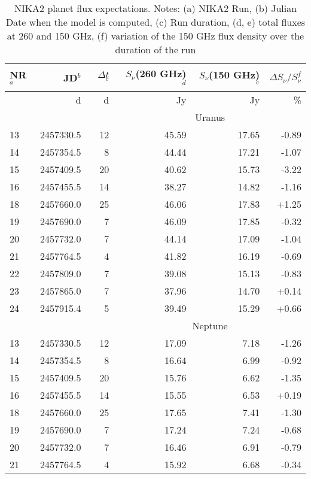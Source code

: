 \begin{table*}[!h]
  \caption[NIKA2 planet flux expectations]{NIKA2 planet flux
    expectations. Notes: (a) NIKA2 Run, (b) Julian Date when the model
    is computed, (c) Run duration, (d, e) total fluxes at 260 and 150
    GHz, (f) variation of the 150 GHz flux density over the duration of the run}
\centering
\begin{tabular}{|l|r|r|r|r|r|}
\hline
NR$^{a}$  & JD$^{b}$ & $\Delta t$ $^{c}$ & $S_{\nu}$(260 GHz)  $^{d}$& $S_{\nu}$(150  GHz)$^{e}$  & $\Delta S_{\nu}/  S_{\nu} ^{f}$  \\
\hline
         & d  &  d        & Jy               & Jy                 &                                                                    \%  \\
\hline
         &    &            & \multicolumn{3}{|c|}{Uranus}\\
\hline
13 & 2457330.5 &  12 & 45.59 & 17.65 & -0.89\\
14 & 2457354.5 &  8 & 44.44 & 17.21 & -1.07\\
15 & 2457409.5 &  20 & 40.62 & 15.73 & -3.22\\
16 & 2457455.5 &  14 & 38.27 & 14.82 & -1.16\\
18 & 2457660.0 &  25 & 46.06 & 17.83 & +1.25\\
19 & 2457690.0 &  7 & 46.09 & 17.85 & -0.32\\
20 & 2457732.0 &  7 & 44.14 & 17.09 & -1.04\\
21 & 2457764.5 &  4 & 41.82 & 16.19 & -0.69\\
22 & 2457809.0 &  7 & 39.08 & 15.13 & -0.83\\
23 & 2457865.0 &  7 & 37.96 & 14.70 & +0.14\\
24 & 2457915.4 &  5 &  39.49 & 15.29 & +0.66 \\
\hline
         &    &            & \multicolumn{3}{|c|}{Neptune}\\
\hline
13 & 2457330.5 &  12 & 17.09 & 7.18 & -1.26\\
14 & 2457354.5 &  8 & 16.64 & 6.99 & -0.92\\
15 & 2457409.5 &  20 & 15.76 & 6.62 & -1.35\\
16 & 2457455.5 &  14 & 15.55 & 6.53 & +0.19\\
18 & 2457660.0 &  25 & 17.65 & 7.41 & -1.30\\
19 & 2457690.0 &  7 & 17.24 & 7.24 & -0.68\\
20 & 2457732.0 &  7 & 16.46 & 6.91 & -0.79\\
21 & 2457764.5 &  4 & 15.92 & 6.68 & -0.34\\

\end{tabular}
\end{table*}
